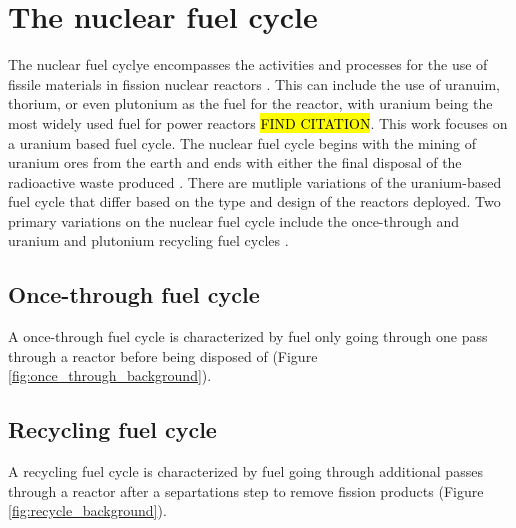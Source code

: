\section{The nuclear fuel cycle}
The nuclear fuel cyclye encompasses the activities and processes 
for the use of fissile materials in fission nuclear reactors \cite{tsoulfanidis_nuclear_2013}. 
This can include the use of uranuim, thorium, or even plutonium as the 
fuel for the reactor, with uranium being the most widely used fuel for 
power reactors \hl{FIND CITATION}. This work focuses on a uranium based 
fuel cycle. The nuclear fuel cycle begins with the mining of uranium ores from the earth 
and ends with either the final disposal of the radioactive waste produced 
\cite{tsoulfanidis_nuclear_2013}. There are mutliple variations of 
the uranium-based fuel cycle that differ based on the type and design of 
the reactors deployed. Two primary variations on the nuclear fuel cycle 
include the once-through and uranium and plutonium recycling fuel cycles 
\cite{tsoulfanidis_nuclear_2013}.

\subsection{Once-through fuel cycle}
A once-through fuel cycle is characterized by fuel only going through one 
pass through a reactor before being disposed of (Figure \ref{fig:once_through_background}).


\subsection{Recycling fuel cycle}
A recycling fuel cycle is characterized by fuel going through additional 
passes through a reactor after a separtations step to remove fission 
products (Figure \ref{fig:recycle_background}).


